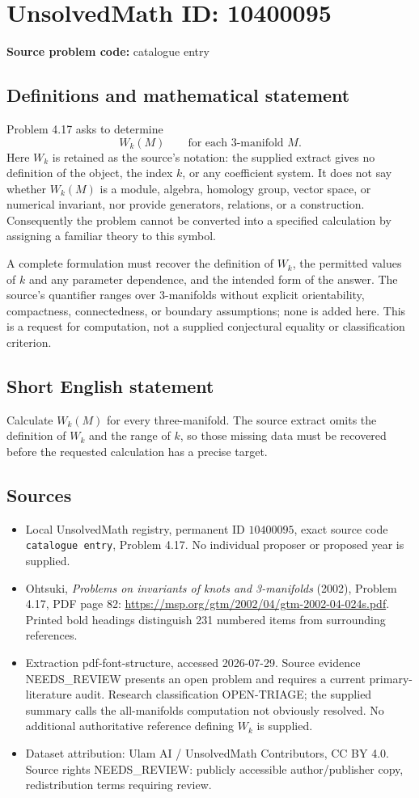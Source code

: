 \documentclass[11pt]{article}
\begin{document}
\section*{UnsolvedMath ID: 10400095}
\textbf{Source problem code:} catalogue entry
\subsection{Definitions and mathematical statement}
Problem 4.17 asks to determine
\[
 W_k(M)\qquad\text{for each }3\text{-manifold }M.
\]
Here \(W_k\) is retained as the source's notation: the supplied extract gives no definition of the object, the index \(k\), or any coefficient system. It does not say whether \(W_k(M)\) is a module, algebra, homology group, vector space, or numerical invariant, nor provide generators, relations, or a construction. Consequently the problem cannot be converted into a specified calculation by assigning a familiar theory to this symbol.

A complete formulation must recover the definition of \(W_k\), the permitted values of \(k\) and any parameter dependence, and the intended form of the answer. The source's quantifier ranges over \(3\)-manifolds without explicit orientability, compactness, connectedness, or boundary assumptions; none is added here. This is a request for computation, not a supplied conjectural equality or classification criterion.
\subsection{Short English statement}
Calculate \(W_k(M)\) for every three-manifold. The source extract omits the definition of \(W_k\) and the range of \(k\), so those missing data must be recovered before the requested calculation has a precise target.
\subsection{Sources}
\begin{itemize}
\item Local UnsolvedMath registry, permanent ID \(10400095\), exact source code \texttt{catalogue entry}, Problem 4.17. No individual proposer or proposed year is supplied.
\item Ohtsuki, \emph{Problems on invariants of knots and 3-manifolds} (2002), Problem 4.17, PDF page 82: \url{https://msp.org/gtm/2002/04/gtm-2002-04-024s.pdf}. Printed bold headings distinguish 231 numbered items from surrounding references.
\item Extraction pdf-font-structure, accessed 2026-07-29. Source evidence NEEDS\_REVIEW presents an open problem and requires a current primary-literature audit. Research classification OPEN-TRIAGE; the supplied summary calls the all-manifolds computation not obviously resolved. No additional authoritative reference defining \(W_k\) is supplied.
\item Dataset attribution: Ulam AI / UnsolvedMath Contributors, CC BY 4.0. Source rights NEEDS\_REVIEW: publicly accessible author/publisher copy, redistribution terms requiring review.
\end{itemize}
\end{document}

